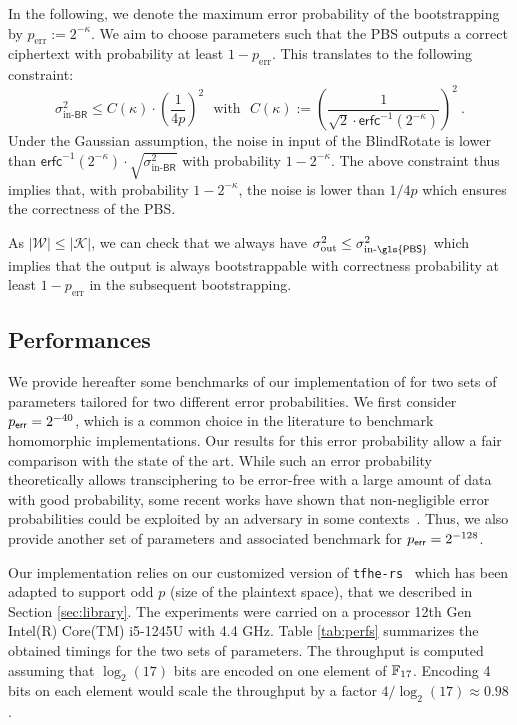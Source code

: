In the following, we denote the maximum error probability of the bootstrapping by $p_{\text{err}} := 2^{-\kappa}$. We aim to choose parameters such that the \gls{PBS} outputs a correct ciphertext with probability at least $1-p_{\text{err}}$. This translates to the following constraint:
$$\sigma^2_{\text{in-}\textsf{BR}} \leq  C(\kappa) \cdot \left(\frac1{4p}\right)^2 ~~~\text{with}~~~C(\kappa) := \left(\frac{1}{\sqrt{2} \cdot \mathsf{erfc}^{-1}(2^{-\kappa})}\right)^2 ~.$$
Under the Gaussian assumption, the noise in input of the \textsf{BlindRotate} is lower than $\mathsf{erfc}^{-1}(2^{-\kappa}) \cdot \sqrt{\sigma^2_{\text{in-}\textsf{BR}}}$ with probability $1-2^{-\kappa}$. The above constraint thus implies that, with probability $1-2^{-\kappa}$, the noise is lower than $1/{4p}$ which ensures the correctness of the \gls{PBS}. 

As $|\mathcal W| \leq |\mathcal K|$, we can check that we always have $\sigma^2_{\text{out}} \leq \sigma^2_{\text{in-}\textsf{\gls{PBS}}}$ which implies that the output is always bootstrappable with correctness probability at least $1-p_{\text{err}}$ in the subsequent bootstrapping.


\subsection{Performances} \label{sec:performances}

We provide hereafter some benchmarks of our implementation of \coolName for two sets of parameters tailored for two different error probabilities. We first consider $p_{\textsf{err}} = 2^{-40}$, which is a common choice in the literature to benchmark homomorphic implementations. Our results for this error probability allow a fair comparison with the state of the art. While such an error probability theoretically allows transciphering to be error-free with a large amount of data with good probability, some recent works have shown that non-negligible error probabilities could be exploited by an adversary in some contexts~\cite{C:CSBB24,CCS:CCPSS24}. Thus, we also provide another set of parameters and associated benchmark for $p_{\textsf{err}} =  2^{-128}$.

Our implementation relies on our customized version of \texttt{tfhe-rs}~\cite{tfhe-rs} which has been adapted to support odd $p$ (size of the plaintext space), that we described in Section \ref{sec:library}. The experiments were carried on a processor 12th Gen Intel(R) Core(TM) i5-1245U with 4.4 GHz. Table \ref{tab:perfs} summarizes the obtained timings for the two sets of parameters. The throughput is computed assuming that $\log_2(17)$ bits are encoded on one element of $\mathbb{F}_{17}$. Encoding 4 bits on each element would scale the throughput by a factor $4/\log_2(17) \approx 0.98$.

